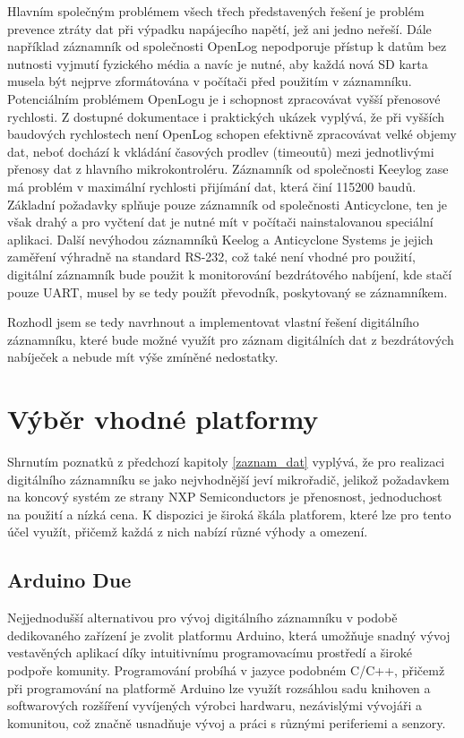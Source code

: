 Hlavním společným problémem všech třech představených řešení je problém prevence ztráty dat při výpadku napájecího napětí, jež ani jedno neřeší. Dále například záznamník od společnosti OpenLog nepodporuje přístup k datům bez nutnosti vyjmutí fyzického média a navíc je nutné, aby každá nová SD karta musela být nejprve zformátována v počítači před použitím v záznamníku. Potenciálním problémem OpenLogu je i schopnost zpracovávat vyšší přenosové rychlosti. Z dostupné dokumentace i praktických ukázek vyplývá, že při vyšších baudových rychlostech není OpenLog schopen efektivně zpracovávat velké objemy dat, neboť dochází k vkládání časových prodlev (timeoutů) mezi jednotlivými přenosy dat z hlavního mikrokontroléru. Záznamník od společnosti Keeylog zase má problém v maximální rychlosti přijímání dat, která činí 115200 baudů. Základní požadavky splňuje pouze záznamník od společnosti Anticyclone, ten je však drahý a pro vyčtení dat je nutné mít v počítači nainstalovanou speciální aplikaci. Další nevýhodou záznamníků Keelog a Anticyclone Systems je jejich zaměření výhradně na standard RS-232, což také není vhodné pro použití, digitální záznamník bude použit k monitorování bezdrátového nabíjení, kde stačí pouze UART, musel by se tedy použít převodník, poskytovaný se záznamníkem.

Rozhodl jsem se tedy navrhnout a implementovat vlastní řešení digitálního záznamníku, které bude možné využít pro záznam digitálních dat z bezdrátových nabíječek a nebude mít výše zmíněné nedostatky.

\section{Výběr vhodné platformy}
Shrnutím poznatků z předchozí kapitoly \ref{zaznam_dat} vyplývá, že pro realizaci digitálního záznamníku se jako nejvhodnější jeví mikrořadič, jelikož požadavkem na koncový systém ze strany NXP Semiconductors je přenosnost, jednoduchost na použití a nízká cena. K dispozici je široká škála platforem, které lze pro tento účel využít, přičemž každá z nich nabízí různé výhody a omezení.


\subsection{Arduino Due}
Nejjednodušší alternativou pro vývoj digitálního záznamníku v podobě dedikovaného zařízení je zvolit platformu Arduino, která umožňuje snadný vývoj vestavěných aplikací díky intuitivnímu programovacímu prostředí a široké podpoře komunity. Programování probíhá v jazyce podobném C/C++, přičemž při programování na platformě Arduino lze využít rozsáhlou sadu knihoven a softwarových rozšíření vyvíjených výrobci hardwaru, nezávislými vývojáři a komunitou, což značně usnadňuje vývoj a práci s různými periferiemi a senzory.


